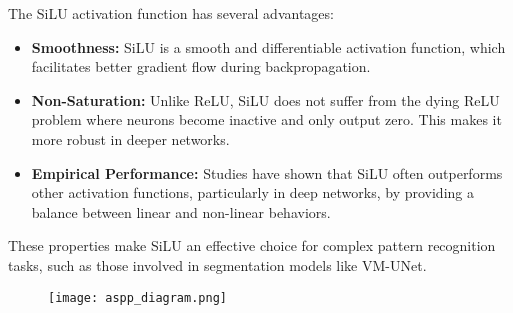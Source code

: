 \documentclass[conference]{IEEEtran}
\begin{document}
The SiLU activation function has several advantages:
\begin{itemize}
    \item \textbf{Smoothness:} SiLU is a smooth and differentiable activation function, which facilitates better gradient flow during backpropagation.
    \item \textbf{Non-Saturation:} Unlike ReLU, SiLU does not suffer from the dying ReLU problem where neurons become inactive and only output zero. This makes it more robust in deeper networks.
    \item \textbf{Empirical Performance:} Studies have shown that SiLU often outperforms other activation functions, particularly in deep networks, by providing a balance between linear and non-linear behaviors.
\end{itemize}

These properties make SiLU an effective choice for complex pattern recognition tasks, such as those involved in segmentation models like VM-UNet.

\begin{figure}[h]
\centering
\texttt{[image: aspp\_diagram.png]}
\label{fig:aspp_diagram}
\end{figure}
\end{document}
